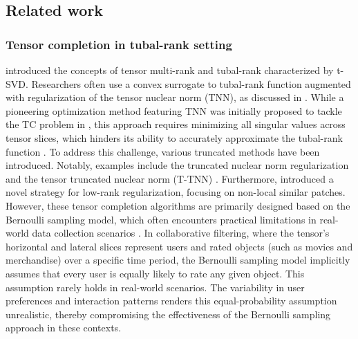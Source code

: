 \documentclass[twoside,12pt]{article}
\begin{document}
 \subsection{Related work}
\subsubsection{\textnormal{Tensor completion in tubal-rank setting}}
\cite{kilmer2011factorization}  introduced the concepts of tensor multi-rank and tubal-rank characterized by t-SVD. Researchers often use a convex surrogate to tubal-rank function augmented with regularization of the tensor nuclear norm (TNN), as discussed in \citep{jiang2020multi,jiang2020framelet,lu2016tensor,Lu18,zhang2017exact,zhou2017tensor}. While a pioneering optimization method featuring TNN was initially proposed to tackle the TC problem in  \citep{zhang2014novel}, this approach requires minimizing  all singular values across tensor slices, which hinders its ability to accurately approximate the tubal-rank function \citep{hu2012fast,xue2018low}. To address this challenge, various truncated methods have been introduced. Notably, examples include the truncated nuclear norm regularization \citep{hu2012fast} and the tensor truncated nuclear norm (T-TNN) \citep{xue2018low}. Furthermore, \cite{zhang2019nonlocal} introduced a novel strategy for low-rank regularization, focusing on non-local similar patches. However, these tensor completion algorithms are primarily designed based on the Bernoulli sampling model, which often encounters practical limitations in real-world data collection scenarios \citep{gaur2006statistical,peng2015art}.  %
In collaborative filtering, where the tensor's horizontal and lateral slices represent users and rated objects (such as movies and merchandise) over a specific time period, the Bernoulli sampling model implicitly assumes that every user is equally likely to rate any given object. This assumption rarely holds in real-world scenarios. The variability in user preferences and interaction patterns renders this equal-probability assumption unrealistic, thereby compromising the effectiveness of the Bernoulli sampling approach in these contexts.
\end{document}
